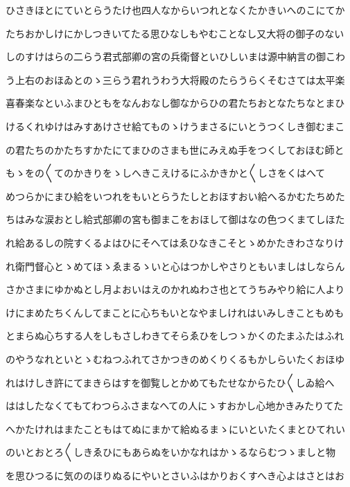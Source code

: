 \documentclass[a4paper,11pt,landscape]{ltjtarticle}
\begin{document}
\par\medskip
ひさきほとにていとらうたけ也四人なからいつれとなくたかきいへのこにてか
\par\medskip
たちおかしけにかしつきいてたる思ひなしもやむことなし又大将の御子のない
\par\medskip
しのすけはらの二らう君式部卿の宮の兵衛督といひしいまは源中納言の御こわ
\par\medskip
う上右のおほゐとのゝ三らう君れうわう大将殿のたらうらくそむさては太平楽
\par\medskip
喜春楽なといふまひともをなんおなし御なからひの君たちおとなたちなとまひ
\par\medskip
けるくれゆけはみすあけさせ給てものゝけうまさるにいとうつくしき御むまこ
\par\medskip
の君たちのかたちすかたにてまひのさまも世にみえぬ手をつくしておほむ師と
\par\medskip
もゝをの〱てのかきりをゝしへきこえけるにふかきかと〱しさをくはへて
\par\medskip
めつらかにまひ給をいつれをもいとらうたしとおほすおい給へるかむたちめた
\par\medskip
ちはみな涙おとし給式部卿の宮も御まこをおほして御はなの色つくまてしほた
\par\medskip
れ給あるしの院すくるよはひにそへてはゑひなきこそとゝめかたきわさなりけ
\par\medskip
れ衛門督心とゝめてほゝゑまるゝいと心はつかしやさりともいましはしならん
\par\medskip
さかさまにゆかぬとし月よおいはえのかれぬわさ也とてうちみやり給に人より
\par\medskip
けにまめたちくんしてまことに心ちもいとなやましけれはいみしきこともめも
\par\medskip
とまらぬ心ちする人をしもさしわきてそらゑひをしつゝかくのたまふたはふれ
\par\medskip
のやうなれといとゝむねつふれてさかつきのめくりくるもかしらいたくおほゆ
\par\medskip
れはけしき許にてまきらはすを御覧しとかめてもたせなからたひ〱しゐ給へ
\par\medskip
ははしたなくてもてわつらふさまなへての人にゝすおかし心地かきみたりてた
\par\medskip
へかたけれはまたこともはてぬにまかて給ぬるまゝにいといたくまとひてれい
\par\medskip
のいとおとろ〱しきゑひにもあらぬをいかなれはかゝるならむつゝましと物
\par\medskip
を思ひつるに気ののほりぬるにやいとさいふはかりおくすへき心よはさとはお
\par\medskip
\end{document}
